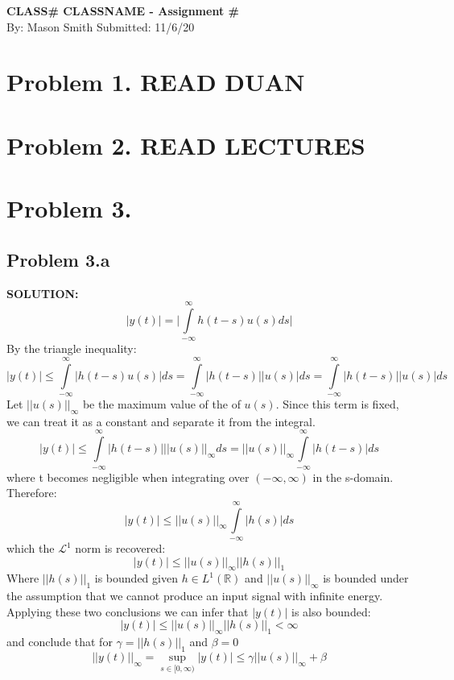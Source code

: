 \documentclass[10pt,a4paper]{article}
\author{Mason Smith}
\begin{document}
\begin{center}
\Large{ \bf CLASS\# CLASSNAME - Assignment \#} \\ \vspace{3mm}
\large{By: Mason Smith }
\large{Submitted: 11/6/20 }
\end{center}
\section{Problem 1. READ DUAN}
\section{Problem 2. READ LECTURES}

\section{Problem 3.}
\subsection{Problem 3.a}

\begin{tcolorbox}
\textbf{SOLUTION:}\\
$$|y(t)|=\big|\int\limits_{-\infty}^{\infty} h(t-s)u(s) ds\big|$$
By the triangle inequality:
$$|y(t)|\leq \int\limits_{-\infty}^{\infty} \big|h(t-s)u(s)\big| ds
= \int\limits_{-\infty}^{\infty} |h(t-s)||u(s)| ds
= \int\limits_{-\infty}^{\infty} |h(t-s)||u(s)| ds$$
Let $||u(s)||_\infty$ be the maximum value of the of $u(s)$. Since this term is fixed, we can treat it as a constant and separate it from the integral.
$$|y(t)|\leq \int\limits_{-\infty}^{\infty} |h(t-s)|||u(s)||_\infty ds
= ||u(s)||_\infty \int\limits_{-\infty}^{\infty} |h(t-s)|ds$$
where t becomes negligible when integrating over $(-\infty,\infty)$ in the s-domain. Therefore:
$$|y(t)|\leq ||u(s)||_\infty \int\limits_{-\infty}^{\infty} |h(s)|ds$$
which the $\mathcal{L}^1$ norm is recovered:
$$|y(t)|\leq ||u(s)||_\infty ||h(s)||_1$$
Where $||h(s)||_1$ is bounded given $h\in L^1(\mathbb{R})$ and $||u(s)||_\infty$ is bounded under the assumption that we cannot produce an input signal with infinite energy.  Applying these two conclusions we can  infer that $|y(t)|$ is also bounded:
$$|y(t)| \leq ||u(s)||_\infty ||h(s)||_1<\infty$$
and conclude that for $\gamma=||h(s)||_1$ and $\beta=0$
$$||y(t)||_\infty= \sup\limits_{s\in[0,\infty)}|y(t)| \leq \gamma ||u(s)||_\infty+\beta$$
\end{tcolorbox}
\end{document}
